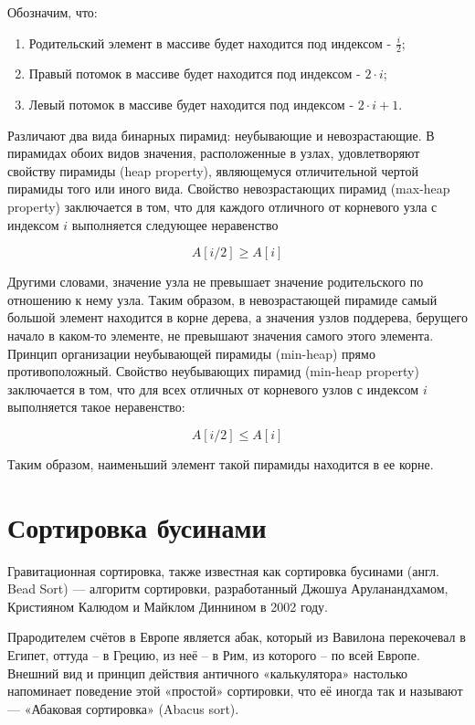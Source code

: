Обозначим, что:
\begin{enumerate} 
	\item Родительский элемент в массиве будет находится под индексом - $\frac{i}{2}$;
	\item Правый потомок в массиве будет находится под индексом - $2 \cdot i$;
	\item Левый потомок в массиве будет находится под индексом - $2 \cdot i + 1$.
\end{enumerate}

Различают два вида бинарных пирамид: неубывающие и невозрастающие. В пирамидах обоих видов значения, расположенные в узлах, удовлетворяют свойству пирамиды (heap property), являющемуся отличительной чертой пирамиды того или иного вида. Свойство невозрастающих пирамид (max-heap property) заключается в том, что для каждого отличного от корневого узла с индексом $i$ выполняется следующее неравенство

\begin{equation}
	A[i / 2] \geq A[i]
\end{equation}

Другими словами, значение узла не превышает значение родительского по отношению к нему узла. Таким образом, в невозрастающей пирамиде самый большой элемент находится в корне дерева, а значения узлов поддерева, берущего начало в каком-то элементе, не превышают значения самого этого элемента. Принцип организации неубывающей пирамиды (min-heap) прямо противоположный. Свойство неубывающих пирамид (min-heap property) заключается в том, что для всех отличных от корневого узлов с индексом $i$ выполняется такое неравенство:

\begin{equation}
	A[i / 2] \leq A[i]
\end{equation}

Таким образом, наименьший элемент такой пирамиды находится в ее корне.

\section{Сортировка бусинами}

Гравитационная сортировка, также известная как сортировка бусинами (англ. Bead Sort) — алгоритм сортировки, разработанный Джошуа Аруланандхамом, Кристияном Калюдом и Майклом Диннином в 2002 году.

Прародителем счётов в Европе является абак, который из Вавилона перекочевал в Египет, оттуда – в Грецию, из неё – в Рим, из которого – по всей Европе. Внешний вид и принцип действия античного «калькулятора» настолько напоминает поведение этой «простой» сортировки, что её иногда так и называют — «Абаковая сортировка» (Abacus sort).

